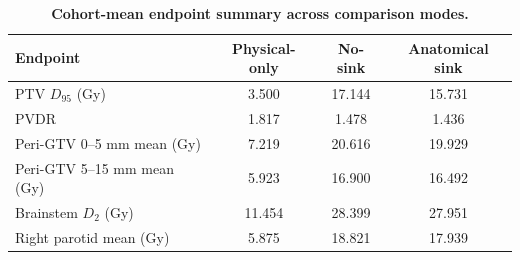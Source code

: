 \begin{table}[H]
\centering
\caption{\textbf{Cohort-mean endpoint summary across comparison modes.}}
\label{tab:cohort_mode_summary}
\small
\begin{tabular}{p{3.9cm}ccc}
\toprule
Endpoint & Physical-only & No-sink & Anatomical sink \\
\midrule
PTV $D_{95}$ (Gy) & 3.500 & 17.144 & 15.731 \\
PVDR & 1.817 & 1.478 & 1.436 \\
Peri-GTV 0--5 mm mean (Gy) & 7.219 & 20.616 & 19.929 \\
Peri-GTV 5--15 mm mean (Gy) & 5.923 & 16.900 & 16.492 \\
Brainstem $D_{2}$ (Gy) & 11.454 & 28.399 & 27.951 \\
Right parotid mean (Gy) & 5.875 & 18.821 & 17.939 \\
\bottomrule
\end{tabular}
\end{table}
